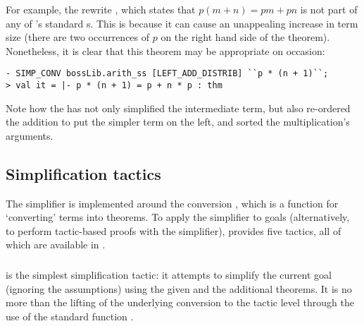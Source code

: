 {For example, the rewrite , which
states that $p(m + n) = pm + pn$ is not part of any of \HOL's standard
\simpset{}s.  This is because it can cause an unappealing increase in
term size (there are two occurrences of $p$ on the right hand
side of the theorem).  Nonetheless, it is clear that this theorem may
be appropriate on occasion:
\begin{session}
\begin{hol}
\begin{verbatim}
- SIMP_CONV bossLib.arith_ss [LEFT_ADD_DISTRIB] ``p * (n + 1)``;
> val it = |- p * (n + 1) = p + n * p : thm
\end{verbatim}
\end{hol}
\end{session}
Note how the  \simpset{} has not only simplified the
intermediate  term, but also re-ordered the addition to
put the simpler term on the left, and sorted the multiplication's
arguments.


\subsection{Simplification tactics}
\label{sec:simplification-tactics}

The simplifier is implemented around the conversion ,
which is a function for `converting' terms into theorems.  To apply
the simplifier to goals (alternatively, to perform tactic-based proofs
with the simplifier), \HOL{} provides five tactics, all of which are
available in .

\subsubsection{}

 is the simplest simplification tactic: it attempts to
simplify the current goal (ignoring the assumptions) using the given
\simpset{} and the additional theorems.  It is no more than the
lifting of the underlying  conversion to the tactic
level through the use of the standard function .

\subsubsection{}

}
